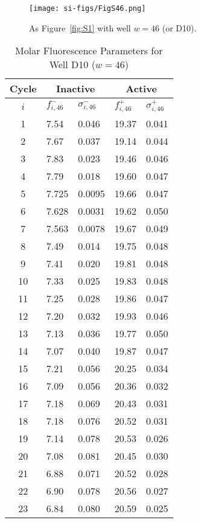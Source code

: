                 \begin{figure}
                    \centering
                    \texttt{[image: si-figs/FigS46.png]}
                    \caption{
                        As Figure~\ref{fig:S1} with well $w=46$ (or D10).
                    }
                \end{figure}
                \clearpage
    \begin{table}
        \caption{Molar Fluorescence Parameters for Well D10 ($w=46$)}
        \centering
        \begin{tabular}{c|ll|ll}
            Cycle & \multicolumn{2}{c|}{Inactive} & \multicolumn{2}{c}{Active} \\
            \hline
            $i$ & $f_{i,46}^{-}$ & $\sigma_{i,46}^{-}$ &  $f_{i,46}^{+}$ & $\sigma_{i,46}^{+}$ \\
            \hline
    1 & 7.54 & 0.046 & 19.37 & 0.041 \\
2 & 7.67 & 0.037 & 19.14 & 0.044 \\
3 & 7.83 & 0.023 & 19.46 & 0.046 \\
4 & 7.79 & 0.018 & 19.60 & 0.047 \\
5 & 7.725 & 0.0095 & 19.66 & 0.047 \\
6 & 7.628 & 0.0031 & 19.62 & 0.050 \\
7 & 7.563 & 0.0078 & 19.67 & 0.049 \\
8 & 7.49 & 0.014 & 19.75 & 0.048 \\
9 & 7.41 & 0.020 & 19.81 & 0.048 \\
10 & 7.33 & 0.025 & 19.83 & 0.048 \\
11 & 7.25 & 0.028 & 19.86 & 0.047 \\
12 & 7.20 & 0.032 & 19.93 & 0.046 \\
13 & 7.13 & 0.036 & 19.77 & 0.050 \\
14 & 7.07 & 0.040 & 19.87 & 0.047 \\
15 & 7.21 & 0.056 & 20.25 & 0.034 \\
16 & 7.09 & 0.056 & 20.36 & 0.032 \\
17 & 7.18 & 0.069 & 20.43 & 0.031 \\
18 & 7.18 & 0.076 & 20.52 & 0.031 \\
19 & 7.14 & 0.078 & 20.53 & 0.026 \\
20 & 7.08 & 0.081 & 20.45 & 0.030 \\
21 & 6.88 & 0.071 & 20.52 & 0.028 \\
22 & 6.90 & 0.078 & 20.56 & 0.027 \\
23 & 6.84 & 0.080 & 20.59 & 0.025 \\

\end{tabular}
\end{table}
